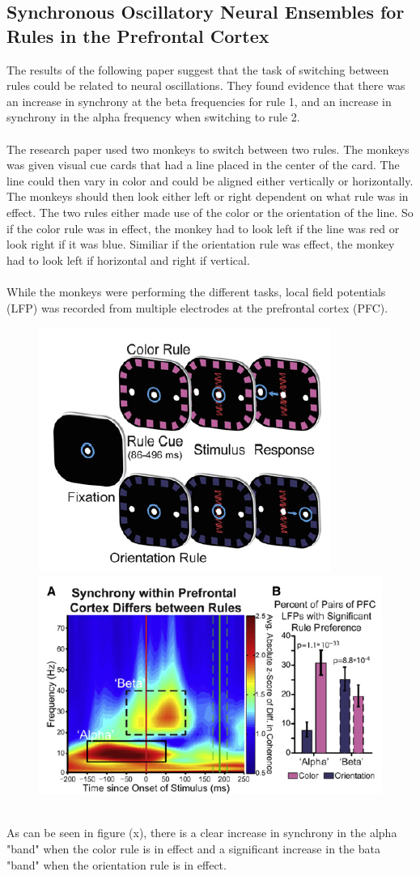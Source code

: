 \documentclass[11pt, a4paper]{article}
\begin{document}
\subsection{Synchronous Oscillatory Neural Ensembles
for Rules in the Prefrontal Cortex}
The results of the following paper suggest that the task of switching between rules could be related to neural oscillations. They found evidence that there was an increase in synchrony at the beta frequencies for rule 1, and an increase in synchrony in the alpha frequency when switching to rule 2.
\\
\\
The research paper used two monkeys to switch between two rules. The monkeys was given visual cue cards that had a line placed in the center of the card. The line could then vary in color and could be aligned either vertically or horizontally. The monkeys should then look either left or right dependent on what rule was in effect. The two rules either made use of the color or the orientation of the line. So if the color rule was in effect, the monkey had to look left if the line was red or look right if it was blue. Similiar if the orientation rule was effect, the monkey had to look left if horizontal and right if vertical.
\\
\\
While the monkeys were performing the different tasks, local field potentials (LFP) was recorded from multiple electrodes at the prefrontal cortex (PFC).
\begin{figure}[!ht]
\centering
\includegraphics[scale=0.5]{MonkeyRules}
\includegraphics[scale=0.5]{MonkeyResults}
\caption{}
\end{figure}
\\
As can be seen in figure (x), there is a clear increase in synchrony in the alpha "band" when the color rule is in effect and a significant increase in the bata "band" when the orientation rule is in effect.
\end{document}
